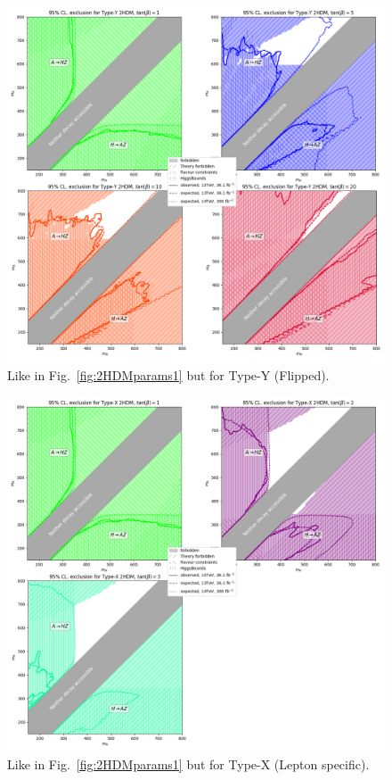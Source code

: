 \begin{figure}[t!]	     
    \includegraphics[width=\textwidth]{single_tbs/type3.png}
    \caption{Like in Fig.~\ref{fig:2HDMparams1} but for Type-Y (Flipped).}\label{fig:2HDMparams3}
\end{figure}

\begin{figure}[t!]
	\centering
    \includegraphics[width=\textwidth]{single_tbs/type4.png}
    \caption{Like in Fig.~\ref{fig:2HDMparams1} but for  Type-X (Lepton specific).}\label{fig:2HDMparams4}
\end{figure}


